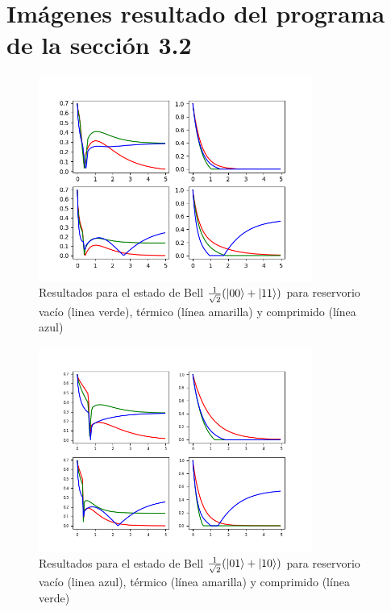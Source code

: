 \documentclass{book}
\begin{document}
\appendix
\chapter{Imágenes resultado del programa de la sección 3.2}
\begin{figure}[ht]
\centering
\includegraphics[width=0.8\textwidth]{bell1.png}
\caption{Resultados para el estado de Bell ${\frac{1}{\sqrt{2}}(\ket{00}+\ket{11})}$ para reservorio vacío (linea verde), térmico (línea amarilla) y comprimido (línea azul)}
\end{figure}

\begin{figure}[ht]
\centering
\includegraphics[width=0.8\textwidth]{bell3.png}
\caption{Resultados para el estado de Bell ${\frac{1}{\sqrt{2}}(\ket{01}+\ket{10})}$ para reservorio vacío (linea azul), térmico (línea amarilla) y comprimido (línea verde)}
\end{figure}
\end{document}
